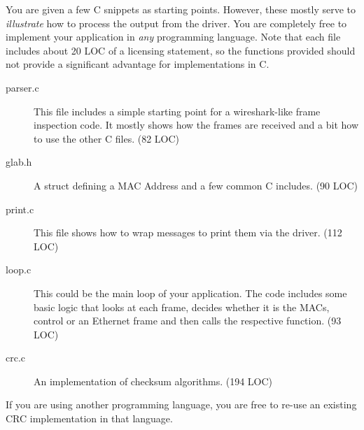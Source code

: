 
You are given a few C snippets as starting points. However, these
mostly serve to {\em illustrate} how to process the output from the
driver. You are completely free to implement your application in {\em
  any} programming language.  Note that each file includes about 20
LOC of a licensing statement, so the functions provided should not
provide a significant advantage for implementations in C.

\begin{description}
\item[parser.c]{This file includes a simple starting point for
  a wireshark-like frame inspection code.
  It mostly shows how the frames are received and
  a bit how to use the other C files. (82 LOC)}
\item[glab.h]{A struct defining a MAC Address and a few common C includes. (90 LOC)}
\item[print.c]{This file shows how to wrap messages to print them
  via the driver. (112 LOC)}
\item[loop.c]{This could be the main loop of your application. The code includes
  some basic logic that looks at each frame, decides whether it is the MACs,
  control or an Ethernet frame and then calls the respective function. (93 LOC)}
\item[crc.c]{An implementation of checksum algorithms. (194 LOC)}
\end{description}

If you are using another programming language, you are free to re-use
an existing CRC implementation in that language.
